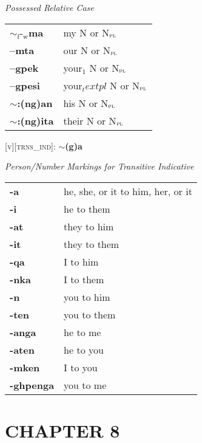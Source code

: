 \documentclass{article}
\begin{document}
\bigskip

\textit{Possessed Relative Case} \\
\begin{tabular}{ l l }
\textbf{$\sim_\text{f}\text{-}_\text{w}$ma} & my N or N$_\text{\textsc{pl}}$ \\
\textbf{--mta} &  our N or N$_\text{\textsc{pl}}$\\
\textbf{--gpek} & your$_1$ N or N$_\text{\textsc{pl}}$ \\
\textbf{--gpesi} & your$_text{pl}$ N or N$_\text{\textsc{pl}}$ \\
\textbf{$\sim$:(ng)an} & his N or N$_\text{\textsc{pl}}$ \\
\textbf{$\sim$:(ng)ita} & their N or N$_\text{\textsc{pl}}$ \\
\end{tabular}

\bigskip

\textsc{[v][trns\_ind]}: \textbf{$\sim$(g)a}

\bigskip

\textit{Person/Number Markings for Transitive Indicative}

\begin{tabular}{ l l }
\textbf{-a} & he, she, or it to him, her, or it\\
\textbf{-i} & he to them \\
\textbf{-at} & they to him \\
\textbf{-it} & they to them \\
\textbf{-qa} & I to him \\
\textbf{-nka} & I to them \\
\textbf{-n} & you to him \\
\textbf{-ten} & you to them \\
\textbf{-anga} & he to me \\
\textbf{-aten} & he to you \\
\textbf{-mken} & I to you \\
\textbf{-ghpenga} & you to me
\end{tabular}

\section*{CHAPTER 8}
\end{document}
